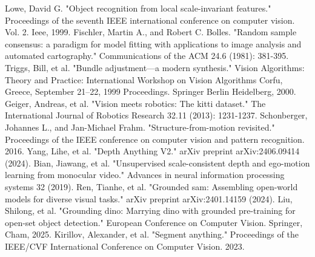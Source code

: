\documentclass[conference]{IEEEtran}
\begin{document}
\begin{thebibliography}{00}
 Lowe, David G. "Object recognition from local scale-invariant features." Proceedings of the seventh IEEE international conference on computer vision. Vol. 2. Ieee, 1999.
 Fischler, Martin A., and Robert C. Bolles. "Random sample consensus: a paradigm for model fitting with applications to image analysis and automated cartography." Communications of the ACM 24.6 (1981): 381-395.
 Triggs, Bill, et al. "Bundle adjustment—a modern synthesis." Vision Algorithms: Theory and Practice: International Workshop on Vision Algorithms Corfu, Greece, September 21–22, 1999 Proceedings. Springer Berlin Heidelberg, 2000.
 Geiger, Andreas, et al. "Vision meets robotics: The kitti dataset." The International Journal of Robotics Research 32.11 (2013): 1231-1237.
 Schonberger, Johannes L., and Jan-Michael Frahm. "Structure-from-motion revisited." Proceedings of the IEEE conference on computer vision and pattern recognition. 2016.
 Yang, Lihe, et al. "Depth Anything V2." arXiv preprint arXiv:2406.09414 (2024).
 Bian, Jiawang, et al. "Unsupervised scale-consistent depth and ego-motion learning from monocular video." Advances in neural information processing systems 32 (2019).
Ren, Tianhe, et al. "Grounded sam: Assembling open-world models for diverse visual tasks." arXiv preprint arXiv:2401.14159 (2024).
Liu, Shilong, et al. "Grounding dino: Marrying dino with grounded pre-training for open-set object detection." European Conference on Computer Vision. Springer, Cham, 2025.
Kirillov, Alexander, et al. "Segment anything." Proceedings of the IEEE/CVF International Conference on Computer Vision. 2023.
\end{thebibliography}
\vspace{12pt}
\end{document}
